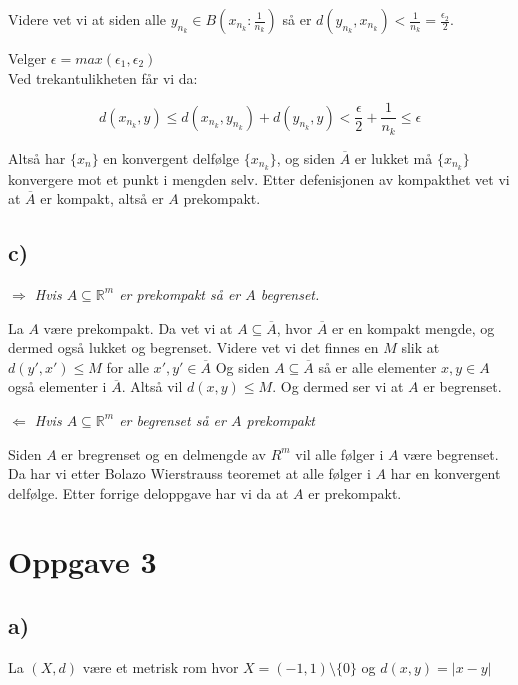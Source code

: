 \documentclass{article}
\begin{document}
                    Videre vet vi at siden alle $y_{n_k} \in B(x_{n_k} : \frac{1}{n_k})$ så er $d(y_{n_k}, x_{n_k}) < \frac{1}{n_k} = \frac{\epsilon_2}{2}$.


                    Velger $\epsilon = max(\epsilon_1, \epsilon_2)$\\
                    Ved trekantulikheten får vi da:

                    \[d(x_{n_k}, y) \leq d(x_{n_k}, y_{n_k}) + d(y_{n_k}, y) < \frac{\epsilon}{2} + \frac{1}{n_k} \leq \epsilon \]

                    Altså har $\{x_n\}$ en konvergent delfølge $\{x_{n_k}\}$, og siden $\overline{A}$ er lukket må $\{x_{n_k}\}$ konvergere mot et punkt i mengden selv. Etter defenisjonen av kompakthet vet vi at $\overline{A}$ er kompakt, altså er $A$ prekompakt.                    



                    \subsection*{c)}

                    \textit{$\pmb{\Rightarrow}$ Hvis $A \subseteq \mathbb{R}^m$ er prekompakt så er $A$ begrenset.}

                    La $A$ være prekompakt. Da vet vi at $A \subseteq \overline{A}$, hvor $\overline{A}$ er en kompakt mengde, og dermed også lukket og begrenset. Videre vet vi det finnes en $M$ slik at $d(y', x') \leq M$ for alle $x', y' \in \overline{A}$
                    Og siden $A \subseteq \overline{A}$ så er alle elementer $x, y \in A$ også elementer i $\overline{A}$. Altså vil $d(x,y) \leq M$. Og dermed ser vi at $A$ er begrenset.


                    \textit{$\pmb{\Leftarrow}$ Hvis $A \subseteq \mathbb{R}^m$ er begrenset så er $A$ prekompakt}

                    Siden $A$ er bregrenset og en delmengde av $R^m$ vil alle følger i $A$ være begrenset. Da har vi etter Bolazo Wierstrauss teoremet at alle følger i $A$ har en konvergent delfølge. Etter forrige deloppgave har vi da at $A$ er prekompakt.


                    \section*{Oppgave 3}
                    \subsection*{a)}
                    La $(X, d)$ være et metrisk rom hvor $X = (-1,1)\setminus\{0\}$ og $d(x,y) = |x-y|$
\end{document}

